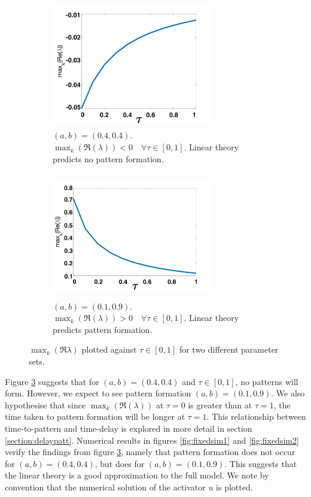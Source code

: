 \begin{figure}[H]
    \centering
    \begin{subfigure}[b]{0.45\textwidth}
        \centering
        \includegraphics[width=7cm,height = 5.5cm]{disp1.png}
        \caption{$(a,b)=(0.4,0.4)$. $\max_k(\Re(\lambda))<0 \quad \forall\tau\in[0,1]$. Linear theory predicts no pattern formation. }
        \label{}
    \end{subfigure}
    \hfill
    \begin{subfigure}[b]{0.45\textwidth}
        \centering
        \includegraphics[width=7cm,height = 5.5cm]{disp2.png}
        \caption{$(a,b)=(0.1,0.9)$. $\max_k(\Re(\lambda))>0 \quad \forall\tau\in[0,1]$. Linear theory predicts pattern formation.}
        \label{}
    \end{subfigure}
    \caption{$\max_k(\Re{\lambda})$ plotted against $\tau\in[0,1]$ for two different parameter sets.}
    \label{fig:dispfixed}
\end{figure}
Figure \ref{fig:dispfixed} suggests that for $(a,b)=(0.4,0.4)$ and $\tau\in[0,1]$, no patterns will form. However, we expect to see pattern formation $(a,b)=(0.1,0.9)$. We also hypothesise that since $\max_k(\Re(\lambda))$ at $\tau=0$ is greater than at $\tau=1$, the time taken to pattern formation will be longer at $\tau=1$. This relationship between time-to-pattern and time-delay is explored in more detail in section \ref{section:delaypatt}. Numerical results in figures \ref{fig:fixedsim1} and \ref{fig:fixedsim2} verify the findings from figure \ref{fig:dispfixed}, namely that pattern formation does not occur for $(a,b)=(0.4,0.4)$, but does for $(a,b)=(0.1,0.9)$.  This suggests that the linear theory is a good approximation to the full model. We note by convention that the numerical solution of the activator $u$ is plotted.
